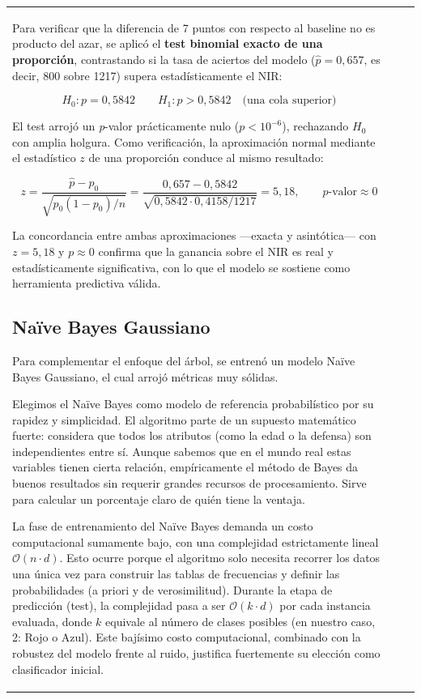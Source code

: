 \documentclass[11pt,a4paper]{article}
\begin{document}
\begin{longtable}{>{\raggedright\arraybackslash}p{5.6cm}>{\raggedright\arraybackslash}p{1.3cm}>{\raggedright\arraybackslash}p{5.1cm}}
Para verificar que la diferencia de 7 puntos con respecto al baseline no es producto del azar, se aplicó el \textbf{test binomial exacto de una proporción}, contrastando si la tasa de aciertos del modelo ($\hat{p} = 0{,}657$, es decir, 800 sobre 1217) supera estadísticamente el NIR:

\[
H_0 : p = 0{,}5842 \qquad H_1 : p > 0{,}5842 \quad \text{(una cola superior)}
\]

El test arrojó un \textit{p}-valor prácticamente nulo ($p < 10^{-6}$), rechazando $H_0$ con amplia holgura. Como verificación, la aproximación normal mediante el estadístico $z$ de una proporción conduce al mismo resultado:

\[
z = \frac{\hat{p} - p_0}{\sqrt{p_0(1-p_0)/n}} = \frac{0{,}657 - 0{,}5842}{\sqrt{0{,}5842 \cdot 0{,}4158 / 1217}} = 5{,}18, \qquad p\text{-valor} \approx 0
\]

La concordancia entre ambas aproximaciones —exacta y asintótica— con $z = 5{,}18$ y $p \approx 0$ confirma que la ganancia sobre el NIR es real y estadísticamente significativa, con lo que el modelo se sostiene como herramienta predictiva válida.



\subsection{Naïve Bayes Gaussiano}

Para complementar el enfoque del árbol, se entrenó un modelo Naïve Bayes Gaussiano, el cual arrojó métricas muy sólidas.

Elegimos el Naïve Bayes como modelo de referencia probabilístico por su rapidez y simplicidad. El algoritmo parte de un supuesto matemático fuerte: considera que todos los atributos (como la edad o la defensa) son independientes entre sí. Aunque sabemos que en el mundo real estas variables tienen cierta relación, empíricamente el método de Bayes da buenos resultados sin requerir grandes recursos de procesamiento. Sirve para calcular un porcentaje claro de quién tiene la ventaja.

La fase de entrenamiento del Naïve Bayes demanda un costo computacional sumamente bajo, con una complejidad estrictamente lineal $\mathcal{O}(n \cdot d)$. Esto ocurre porque el algoritmo solo necesita recorrer los datos una única vez para construir las tablas de frecuencias y definir las probabilidades (a priori y de verosimilitud). Durante la etapa de predicción (test), la complejidad pasa a ser $\mathcal{O}(k \cdot d)$ por cada instancia evaluada, donde $k$ equivale al número de clases posibles (en nuestro caso, 2: Rojo o Azul). Este bajísimo costo computacional, combinado con la robustez del modelo frente al ruido, justifica fuertemente su elección como clasificador inicial.


\end{longtable}
\end{document}
